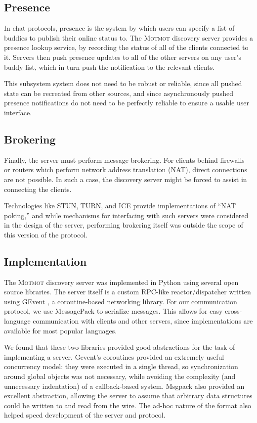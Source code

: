 \documentclass{sig-alternate}
\newcommand\Motmot{\textsc{Motmot}\xspace}
\begin{document}
\subsection{Presence}

In chat protocols, presence is the system by which users can specify a list of
buddies to publish their online status to. The \Motmot discovery server provides
a presence lookup service, by recording the status of all of the clients
connected to it. Servers then push presence updates to all of the other servers
on any user's buddy list, which in turn push the notification to the relevant
clients.

This subsystem system does not need to be robust or reliable, since all pushed
state can be recreated from other sources, and since asynchronously pushed
presence notifications do not need to be perfectly reliable to ensure a usable
user interface.

\subsection{Brokering}

Finally, the server must perform message brokering. For clients behind firewalls
or routers which perform network address translation (NAT), direct connections
are not possible. In such a case, the discovery server might be forced to assist
in connecting the clients.

Technologies like STUN, TURN, and ICE provide implementations of ``NAT poking,''
and while mechanisms for interfacing with such servers were considered in the
design of the server, performing brokering itself was outside the scope of this
version of the protocol.

\subsection{Implementation}

The \Motmot discovery server was implemented in Python using several open source
libraries. The server itself is a custom RPC-like reactor/dispatcher written
using GEvent \cite{glib}, a coroutine-based networking library. For our
communication protocol, we use MessagePack \cite{msgpack} to serialize messages.
This allows for easy cross-language communication with clients and other servers,
since implementations are available for most popular languages.

We found that these two libraries provided good abstractions for the task of
implementing a server. Gevent's coroutines provided an extremely useful
concurrency model: they were executed in a single thread, so synchronization
around global objects was not necessary, while avoiding the complexity (and
unnecessary indentation) of a callback-based system. Msgpack also provided an
excellent abstraction, allowing the server to assume that arbitrary data
structures could be written to and read from the wire. The ad-hoc nature of the
format also helped speed development of the server and protocol.
\end{document}
